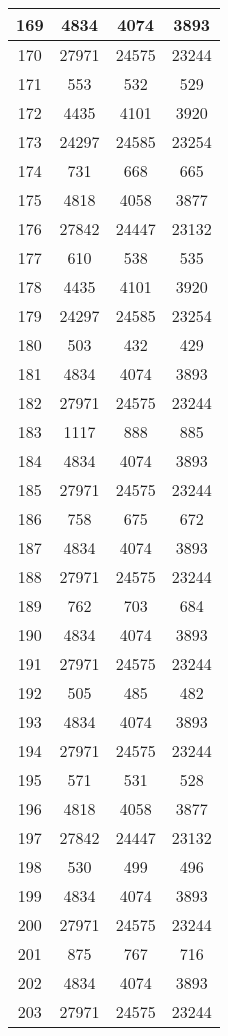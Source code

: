 \begin{table}[H]
\begin{tabular}{|c|c|c|c|}
169 & 4834 & 4074 & 3893 \\
\hline
170 & 27971 & 24575 & 23244 \\
\hline
171 & 553 & 532 & 529 \\
\hline
172 & 4435 & 4101 & 3920 \\
\hline
173 & 24297 & 24585 & 23254 \\
\hline
174 & 731 & 668 & 665 \\
\hline
175 & 4818 & 4058 & 3877 \\
\hline
176 & 27842 & 24447 & 23132 \\
\hline
177 & 610 & 538 & 535 \\
\hline
178 & 4435 & 4101 & 3920 \\
\hline
179 & 24297 & 24585 & 23254 \\
\hline
180 & 503 & 432 & 429 \\
\hline
181 & 4834 & 4074 & 3893 \\
\hline
182 & 27971 & 24575 & 23244 \\
\hline
183 & 1117 & 888 & 885 \\
\hline
184 & 4834 & 4074 & 3893 \\
\hline
185 & 27971 & 24575 & 23244 \\
\hline
186 & 758 & 675 & 672 \\
\hline
187 & 4834 & 4074 & 3893 \\
\hline
188 & 27971 & 24575 & 23244 \\
\hline
189 & 762 & 703 & 684 \\
\hline
190 & 4834 & 4074 & 3893 \\
\hline
191 & 27971 & 24575 & 23244 \\
\hline
192 & 505 & 485 & 482 \\
\hline
193 & 4834 & 4074 & 3893 \\
\hline
194 & 27971 & 24575 & 23244 \\
\hline
195 & 571 & 531 & 528 \\
\hline
196 & 4818 & 4058 & 3877 \\
\hline
197 & 27842 & 24447 & 23132 \\
\hline
198 & 530 & 499 & 496 \\
\hline
199 & 4834 & 4074 & 3893 \\
\hline
200 & 27971 & 24575 & 23244 \\
\hline
201 & 875 & 767 & 716 \\
\hline
202 & 4834 & 4074 & 3893 \\
\hline
203 & 27971 & 24575 & 23244 \\

\end{tabular}
\end{table}
